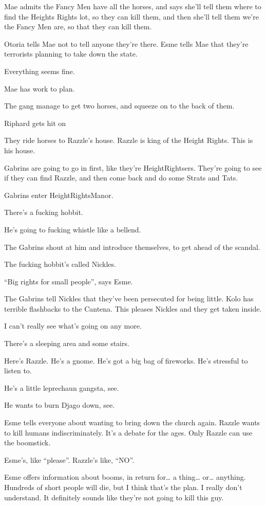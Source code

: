 \documentclass[letterpaper,10pt,twoside,twocolumn,openany]{book}
\begin{document}
Mae admits the Fancy Men have all the horses, and says she’ll tell them where to find the Heights Rights lot, so they can kill them, and then she’ll tell them we’re the Fancy Men are, so that they can kill them.

Otoria tells Mae not to tell anyone they’re there. Esme tells Mae that they’re terrorists planning to take down the state.

Everything seems fine.

Mae has work to plan.

The gang manage to get two horses, and squeeze on to the back of them.

Riphard gets hit on

They ride horses to Razzle’s house. Razzle is king of the Height Rights. This is his house.

Gabrins are going to go in first, like they’re HeightRightsers. They’re going to see if they can find Razzle, and then come back and do some Strats and Tats.

Gabrins enter HeightRightsManor.

There’s a fucking hobbit.

He’s going to fucking whistle like a bellend.

The Gabrins shout at him and introduce themselves, to get ahead of the scandal.

The fucking hobbit’s called Nickles.

“Big rights for small people”, says Esme.

The Gabrins tell Nickles that they’ve been persecuted for being little. Kolo has terrible flashbacks to the Cantena. This pleases Nickles and they get taken inside.

I can’t really see what’s going on any more.

There’s a sleeping area and some stairs.

Here’s Razzle. He’s a gnome. He’s got a big bag of fireworks. He’s stressful to listen to.

He’s a little leprechaun gangsta, see.

He wants to burn Djago down, see.

Esme tells everyone about wanting to bring down the church again. Razzle wants to kill humans indiscriminately. It’s a debate for the ages. Only Razzle can use the boomstick.

Esme’s, like “please”. Razzle’s like, “NO”.

Esme offers information about booms, in return for… a thing… or… anything. Hundreds of short people will die, but I think that’s the plan. I really don’t understand. It definitely sounds like they’re not going to kill this guy.
\end{document}
